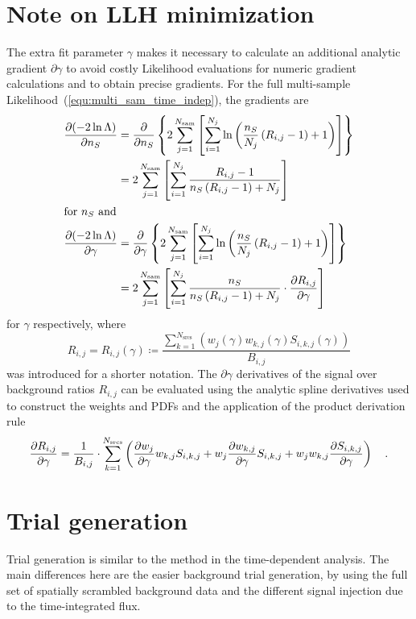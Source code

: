 \section{Note on LLH minimization}
The extra fit parameter $\gamma$ makes it necessary to calculate an additional analytic gradient $\partial{\gamma}$ to avoid costly Likelihood evaluations for numeric gradient calculations and to obtain precise gradients.
For the full multi-sample Likelihood~(\ref{equ:multi_sam_time_indep}), the gradients are
\begin{align}
  \frac{\partial (-2\ln\Lambda)}{\partial n_S}
  &= \frac{\partial }{\partial n_S}\left\{
      2\sum_{j=1}^{N_\text{sam}} \left[
        \sum_{i=1}^{N_j} \ln\left(
          \frac{n_S}{N_j}\left( R_{i,j} - 1 \right) + 1
        \right)
      \right]
    \right\} \\
  &= 2\sum_{j=1}^{N_\text{sam}} \left[
      \sum_{i=1}^{N_j}
        \frac{R_{i,j} - 1}{n_S\left( R_{i,j} - 1 \right) + N_j}
      \right] \\
  \intertext{for $n_S$ and}
  \frac{\partial (-2\ln\Lambda)}{\partial \gamma}
  &= \frac{\partial }{\partial \gamma}\left\{
      2\sum_{j=1}^{N_\text{sam}} \left[
        \sum_{i=1}^{N_j} \ln\left(
          \frac{n_S}{N_j}\left( R_{i,j} - 1 \right) + 1
        \right)
      \right]
    \right\} \\
  &= 2\sum_{j=1}^{N_\text{sam}} \left[
      \sum_{i=1}^{N_j}
        \frac{n_S}{n_S\left( R_{i,j} - 1 \right) + N_j}\cdot
        \frac{\partial R_{i,j}}{\partial \gamma}
      \right]
\end{align}
for $\gamma$ respectively, where
\begin{equation}
  R_{i,j} = R_{i,j}(\gamma)
  \coloneqq \frac{\sum_{k=1}^{N_\text{srcs}}(w_j(\gamma)
                  w_{k,j}(\gamma) S_{i,k,j}(\gamma))}{B_{i,j}}
\end{equation}
was introduced for a shorter notation.
The $\partial{\gamma}$ derivatives of the signal over background ratios $R_{i,j}$ can be evaluated using the analytic spline derivatives used to construct the  weights and PDFs and the application of the product derivation rule
\begin{equation}
  \frac{\partial R_{i,j}}{\partial \gamma}
  = \frac{1}{B_{i,j}}\cdot\sum_{k=1}^{N_\text{srcs}}\left(
      \frac{\partial w_j}{\partial \gamma} w_{k,j} S_{i,k,j} +
      w_j \frac{\partial w_{k,j}}{\partial \gamma} S_{i,k,j} +
      w_j w_{k,j} \frac{\partial S_{i,k,j}}{\partial \gamma}
    \right)
  \quad\text{.}
\end{equation}


\section{Trial generation}
Trial generation is similar to the method in the time-dependent analysis.
The main differences here are the easier background trial generation, by using the full set of spatially scrambled background data and the different signal injection due to the time-integrated flux.

